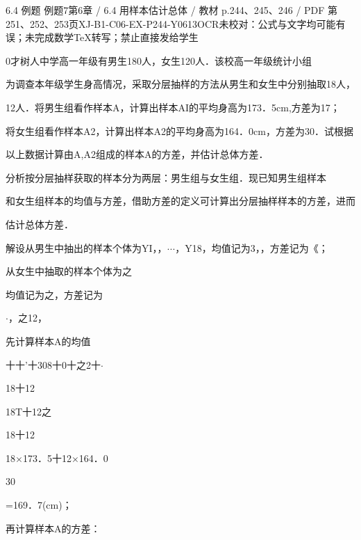 \begin{bankitem}{6.4 例题 例题7}{第6章 / 6.4 用样本估计总体 / 教材 p.244、245、246 / PDF 第251、252、253页}{XJ-B1-C06-EX-P244-Y0613}{OCR未校对：公式与文字均可能有误；未完成数学TeX转写；禁止直接发给学生}
\begin{ocrdraft}
\par
0才树人中学高一年级有男生180人，女生120人．该校高一年级统计小组
\par
为调查本年级学生身高情况，采取分层抽样的方法从男生和女生中分别抽取18人，
\par
12人．将男生组看作样本A，计算出样本AI的平均身高为173．5cm,方差为17；
\par
将女生组看作样本A2，计算出样本A2的平均身高为164．0cm，方差为30．试根据
\par
以上数据计算由A,A2组成的样本A的方差，并估计总体方差．
\par
分析按分层抽样获取的样本分为两层：男生组与女生组．现已知男生组样本
\par
和女生组样本的均值与方差，借助方差的定义可计算出分层抽样样本的方差，进而
\par
估计总体方差．
\par
解设从男生中抽出的样本个体为YI，，\ensuremath{\cdot}\ensuremath{\cdot}\ensuremath{\cdot}，Y18，均值记为3，，方差记为《；
\par
从女生中抽取的样本个体为之
\par
均值记为之，方差记为
\par
\ensuremath{\cdot}，之12，
\par
先计算样本A的均值
\par
十十'十308十0十之2十\ensuremath{\cdot}
\par
18十12
\par
18T十12之
\par
18十12
\par
18\ensuremath{\times}173．5十12\ensuremath{\times}164．0
\par
30
\par
=169．7(cm)；
\par
再计算样本A的方差：
\par

\end{ocrdraft}
\end{bankitem}
